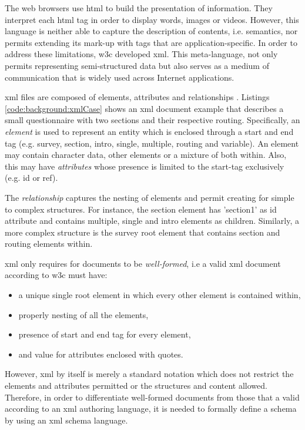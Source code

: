 	The web browsers use \gls{html} to build the presentation of information. They interpret each \gls{html} tag in order to display words, images or videos. However, this language is neither able to capture the description of contents, i.e. semantics, nor permits extending its mark-up with tags that are application-specific. In order to address these limitations, \gls{w3c} developed \gls{xml}. This meta-language, not only permits representing semi-structured data \cite{web:w3cxml} but also serves as a medium of communication that is widely used across Internet applications.

	\gls{xml} files are composed of elements, attributes and relationships \cite{book:varde2010}. Listings \ref{code:background:xmlCase} shows an \gls{xml} document example that describes a small questionnaire with two sections and their respective routing. Specifically, an \emph{element} is used to represent an entity which is enclosed through a start and end tag (e.g. survey, section, intro, single, multiple, routing and variable). An element may contain character data, other elements or a mixture of both within. Also, this may have \emph{attributes} whose presence is limited to the start-tag exclusively (e.g. id or ref).

	

	The \emph{relationship} captures the nesting of elements and permit creating for simple to complex structures. For instance, the section element has 'section1' as id attribute and contains multiple, single and intro elements as children. Similarly, a more complex structure is the survey root element that contains section and routing elements within.

	\gls{xml} only requires for documents to be \emph{well-formed}, i.e a valid \gls{xml} document according to \gls{w3c} must have:
	\begin{itemize}
		\item a unique single root element in which every other element is contained within,
		\item properly nesting of all the elements,
		\item presence of start and end tag for every element,
		\item and value for attributes enclosed with quotes.
	\end{itemize}

	However, \gls{xml} by itself is merely a standard notation which does not restrict the elements and attributes permitted or the structures and content allowed. Therefore, in order to differentiate well-formed documents from those that a valid according to an \gls{xml} authoring language, it is needed to formally define a schema by using an \gls{xml} schema language.